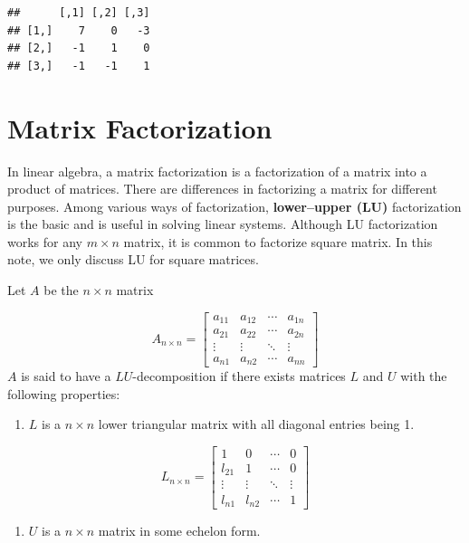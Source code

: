 \documentclass[
]{book}
\providecommand{\tightlist}{%
  \setlength{\itemsep}{0pt}\setlength{\parskip}{0pt}}
\begin{document}
\begin{verbatim}
##      [,1] [,2] [,3]
## [1,]    7    0   -3
## [2,]   -1    1    0
## [3,]   -1   -1    1
\end{verbatim}

\hypertarget{matrix-factorization}{%
\chapter{Matrix Factorization}\label{matrix-factorization}}

In linear algebra, a matrix factorization is a factorization of a matrix into a product of matrices. There are differences in factorizing a matrix for different purposes. Among various ways of factorization, \textbf{lower--upper (LU)} factorization is the basic and is useful in solving linear systems. Although LU factorization works for any \(m\times n\) matrix, it is common to factorize square matrix. In this note, we only discuss LU for square matrices.

Let \(A\) be the \(n\times n\) matrix

\[
A_{n\times n} = \left[\begin{array}{ccccc} 
a_{11} & a_{12} & \cdots & a_{1n}  \\ 
a_{21} & a_{22} & \cdots & a_{2n}  \\ 
\vdots & \vdots & \ddots & \vdots  \\
a_{n1} & a_{n2} & \cdots & a_{nn}  
\end{array}
\right]
\]
\(A\) is said to have a \(LU\)-decomposition if there exists matrices \(L\) and \(U\) with the following properties:

\begin{enumerate}
\def\labelenumi{\arabic{enumi}.}
\tightlist
\item
  \(L\) is a \(n\times n\) lower triangular matrix with all diagonal entries being 1.
\end{enumerate}

\[
L_{n\times n} = \left[\begin{array}{cccc} 
1 & 0 & \cdots & 0  \\ 
l_{21} & 1 & \cdots & 0  \\ 
\vdots & \vdots & \ddots & \vdots  \\
l_{n1} & l_{n2} & \cdots & 1  
\end{array}
\right]
\]

\begin{enumerate}
\def\labelenumi{\arabic{enumi}.}
\setcounter{enumi}{1}
\tightlist
\item
  \(U\) is a \(n\times n\) matrix in some echelon form.
\end{enumerate}
\end{document}
